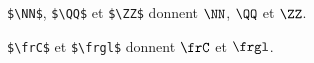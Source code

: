 \documentclass[varwidth, border = 3pt]{standalone}
\begin{document}
\verb#$\NN$#, \verb#$\QQ$# et \verb#$\ZZ$# donnent
$\NN$, $\QQ$ et $\ZZ$.

\verb#$\frC$# et \verb#$\frgl$# donnent 
$\frC$ et $\frgl$.
\end{document}
